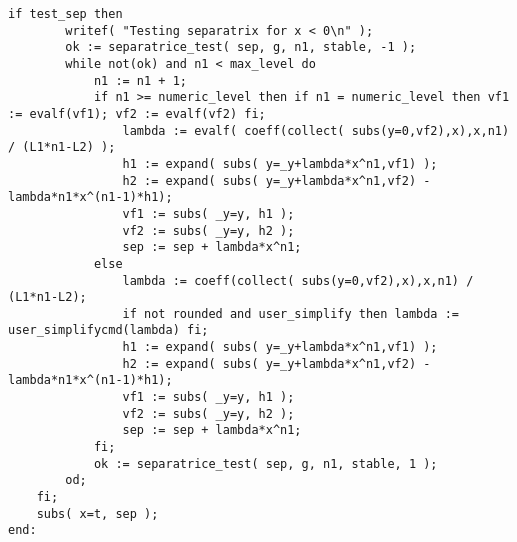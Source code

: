 \documentclass[a4paper,10pt]{article}
\begin{document}
\begin{lstlisting}[name=type]
    if test_sep then
        writef( "Testing separatrix for x < 0\n" );
        ok := separatrice_test( sep, g, n1, stable, -1 );
        while not(ok) and n1 < max_level do
            n1 := n1 + 1;
            if n1 >= numeric_level then if n1 = numeric_level then vf1 := evalf(vf1); vf2 := evalf(vf2) fi;
                lambda := evalf( coeff(collect( subs(y=0,vf2),x),x,n1) / (L1*n1-L2) );
                h1 := expand( subs( y=_y+lambda*x^n1,vf1) );
                h2 := expand( subs( y=_y+lambda*x^n1,vf2) - lambda*n1*x^(n1-1)*h1);
                vf1 := subs( _y=y, h1 );
                vf2 := subs( _y=y, h2 );
                sep := sep + lambda*x^n1;
            else
                lambda := coeff(collect( subs(y=0,vf2),x),x,n1) / (L1*n1-L2);
                if not rounded and user_simplify then lambda := user_simplifycmd(lambda) fi;
                h1 := expand( subs( y=_y+lambda*x^n1,vf1) );
                h2 := expand( subs( y=_y+lambda*x^n1,vf2) - lambda*n1*x^(n1-1)*h1);
                vf1 := subs( _y=y, h1 );
                vf2 := subs( _y=y, h2 );
                sep := sep + lambda*x^n1;
            fi;
            ok := separatrice_test( sep, g, n1, stable, 1 );
        od;
    fi;
    subs( x=t, sep );
end:
\end{lstlisting}
\end{document}
